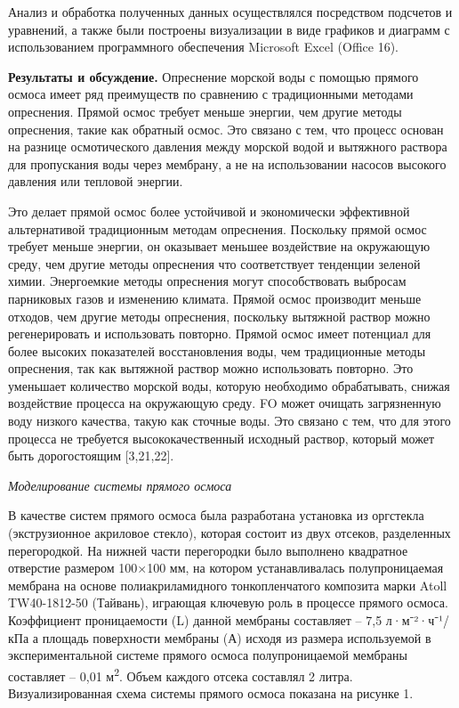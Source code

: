 \begin{multicols}{2}
Анализ и обработка полученных данных осуществлялся посредством подсчетов
и уравнений, а также были построены визуализации в виде графиков и
диаграмм с использованием программного обеспечения Microsoft Excel
(Office 16).

{\bfseries Результаты и обсуждение.} Опреснение морской воды с помощью
прямого осмоса имеет ряд преимуществ по сравнению с традиционными
методами опреснения. Прямой осмос требует меньше энергии, чем другие
методы опреснения, такие как обратный осмос. Это связано с тем, что
процесс основан на разнице осмотического давления между морской водой и
вытяжного раствора для пропускания воды через мембрану, а не на
использовании насосов высокого давления или тепловой энергии.

Это делает прямой осмос более устойчивой и экономически эффективной
альтернативой традиционным методам опреснения. Поскольку прямой осмос
требует меньше энергии, он оказывает меньшее воздействие на окружающую
среду, чем другие методы опреснения что соответствует тенденции зеленой
химии. Энергоемкие методы опреснения могут способствовать выбросам
парниковых газов и изменению климата. Прямой осмос производит меньше
отходов, чем другие методы опреснения, поскольку вытяжной раствор можно
регенерировать и использовать повторно. Прямой осмос имеет потенциал для
более высоких показателей восстановления воды, чем традиционные методы
опреснения, так как вытяжной раствор можно использовать повторно. Это
уменьшает количество морской воды, которую необходимо обрабатывать,
снижая воздействие процесса на окружающую среду. FO может очищать
загрязненную воду низкого качества, такую как сточные воды. Это связано
с тем, что для этого процесса не требуется высококачественный исходный
раствор, который может быть дорогостоящим {[}3,21,22{]}.

\emph{Моделирование системы прямого осмоса}

В качестве систем прямого осмоса была разработана установка из оргстекла
(экструзионное акриловое стекло), которая состоит из двух отсеков,
разделенных перегородкой. На нижней части перегородки было выполнено
квадратное отверстие размером 100×100 мм, на котором устанавливалась
полупроницаемая мембрана на основе полиакриламидного тонкопленчатого
композита марки Atoll TW40-1812-50 (Тайвань), играющая ключевую роль в
процессе прямого осмоса. Коэффициент проницаемости (L) данной мембраны
составляет -- 7,5 л·м⁻²·ч⁻¹/кПа а площадь поверхности мембраны (А)
исходя из размера используемой в экспериментальной системе прямого
осмоса полупроницаемой мембраны составляет -- 0,01 м\textsuperscript{2}.
Объем каждого отсека составлял 2 литра. Визуализированная схема системы
прямого осмоса показана на рисунке 1.
\end{multicols}

